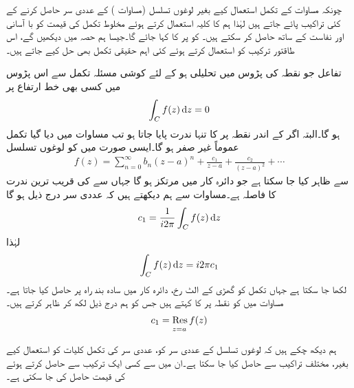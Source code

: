 چونکہ مساوات  کے تکمل استعمال کیے بغیر لوغوں تسلسل (مساوات ) کے عددی سر حاصل کرنے کے کئی تراکیب پائے جاتے ہیں لہٰذا ہم  کا کلیہ استعمال کرتے ہوئے مخلوط تکمل کی قیمت کو با آسانی اور  نفاست کے ساتھ حاصل کر سکتے ہیں۔  کو  پر  کا  کہا جائے گا۔جیسا ہم حصہ میں دیکھیں گے، اس طاقتور ترکیب کو استعمال کرتے ہوئے کئی اہم حقیقی تکمل بھی حل کیے جاتے ہیں۔

تفاعل  جو نقطہ  کی پڑوس میں تحلیلی ہو کے لئے کوشی مسئلہ تکمل سے اس پڑوس میں کسی بھی خط ارتفاع  پر 
\begin{align}\label{مساوات_بقیہ_تکمل_الف}
\int_C f(z)\dif z=0
\end{align}
ہو گا۔البتہ اگر  کے اندر نقطہ   پر  کا تنہا ندرت پایا جاتا ہو تب  مساوات  میں دیا گیا تکمل عموماً غیر صفر ہو گا۔ایسی صورت میں  کو لوغوں تسلسل
\begin{align}\label{مساوات_بقیہ_تکمل_ب}
f(z)=\sum\limits_{n=0}^{\infty} b_n(z-a)^n+\frac{c_1}{z-a}+\frac{c_2}{(z-a)^2}+\cdots
\end{align}
سے ظاہر کیا جا سکتا ہے جو دائرہ کار  میں مرتکز ہو گا جہاں  سے  کی قریب ترین ندرت کا فاصلہ  ہے۔مساوات  سے ہم دیکھتے ہیں کہ عددی سر  درج ذیل ہو گا
\begin{align*}
c_1=\frac{1}{i2\pi}\int_C f(z)\dif z
\end{align*}
لہٰذا
\begin{align}\label{مساوات_بقیہ_تکمل_پ}
\int_C f(z)\dif z=i2\pi c_1
\end{align}
لکھا جا سکتا ہے جہاں تکمل کو گھڑی کے الٹ رخ، دائرہ کار  میں سادہ بند راہ   پر حاصل کیا جاتا ہے۔مساوات  میں  کو نقطہ  پر  کا  کہتے ہیں جس کو ہم درج ذیل لکھ کر ظاہر کرتے ہیں۔
\begin{align}
c_1=\underset{z=a\hfill}{\Res f(z)}
\end{align}

ہم دیکھ چکے ہیں کہ لوغوں تسلسل کے عددی سر کو، عددی سر کی تکمل کلیات کو استعمال کیے بغیر، مختلف تراکیب سے حاصل کیا جا سکتا ہے۔ان میں سے  کسی ایک ترکیب سے  حاصل کرتے ہوئے  کی قیمت حاصل کی جا سکتی ہے۔  

